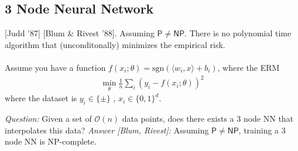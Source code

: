 \subsection{3 Node Neural Network}
[Judd '87] [Blum \& Rivest '88]. Assuming $\mathsf{P} \neq \mathsf{NP}$. There is no polynomial time algorithm that (unconditonally) minimizes the empirical risk.\\
\\
Assume you have a function $f(x_i; \theta) = \text{sgn}(\langle w_i, x\rangle + b_i)$, where the ERM
\begin{align}
	\min_\theta \frac{1}{n} \sum_i (y_i - f(x_i; \theta))^2
\end{align}
where the dataset is $y_i \in \{\pm \}$ , $x_i \in \{0,1\}^d$.

\emph{Question:} Given a set of $\mathcal O(n)$ data points, does there exists a 3 node NN  that interpolates this data? \emph{Answer [Blum, Rivest]:} Assuming $\mathsf P \neq \mathsf{NP}$, training a 3 node NN is NP-complete.

